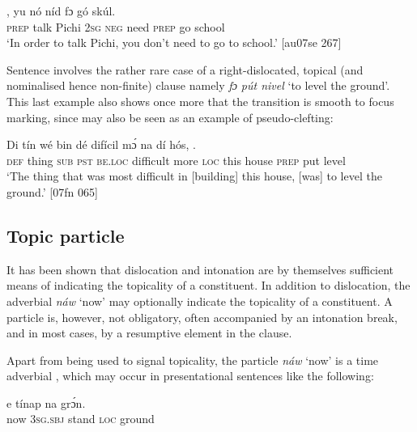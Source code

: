 \ea%
    \label{ex:key:754}
    \gll {}    ,  yu  nó  níd    fɔ  gó  skúl.\\
\textsc{prep}  talk  Pichi  \textsc{2sg}  \textsc{neg}  need  \textsc{prep}  go  school\\

\glt ‘In order to talk Pichi, you don’t need to go to school.’ [au07se 267]
\z

Sentence  involves the rather rare case of a right-dislocated, topical (and nominalised hence non-finite) clause namely \textit{fɔ pút nivel} ‘to level the ground’. This last example also shows once more that the transition is smooth to focus marking, since  may also be seen as an example of pseudo-clefting: 


\ea%
    \label{ex:key:755}
    \gll Di  tín    wé  bin  dé    difícil  mɔ́    na  dí  hós,  
    . \\
\textsc{def}  thing  \textsc{sub}  \textsc{pst}  \textsc{be.loc}  difficult  more  \textsc{loc}  this  house
\textsc{prep}  put  level\\
\glt ‘The thing that was most difficult in [building] this house, [was]
to level the ground.’ [07fn 065]
\z

\subsection{Topic particle}\label{sec:7.5.2}

It has been shown that dislocation and intonation are by themselves sufficient means of indicating the topicality of a constituent. In addition to dislocation, the adverbial \textit{náw} ‘now’ may optionally indicate the topicality of a constituent. A particle is, however, not obligatory, often accompanied by an intonation break, and in most cases, by a resumptive element in the clause.


Apart from being used to signal topicality, the particle \textit{náw} ‘now’ is a time adverbial , which may occur in presentational sentences like the following:



\ea%
    \label{ex:key:756}
    \gll {}    e    tínap  na  grɔ́n.\\
now    \textsc{3sg.sbj}  stand  \textsc{loc}  ground\\

